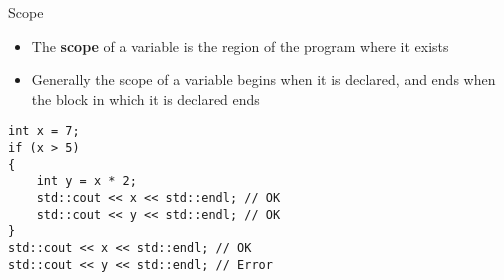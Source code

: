 \begin{frame}[fragile]{Scope}
	\begin{itemize}
		\item The \textbf{scope} of a variable is the region of the program where it exists \pause
		\item Generally the scope of a variable begins when it is declared,
		and ends when the block in which it is declared ends \pause
	\end{itemize}
	\begin{lstlisting}
int x = 7;
if (x > 5)
{
    int y = x * 2;
    std::cout << x << std::endl; // OK
    std::cout << y << std::endl; // OK
}
std::cout << x << std::endl; // OK
std::cout << y << std::endl; // Error
	\end{lstlisting}
\end{frame}
